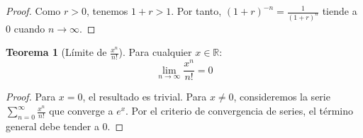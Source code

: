 \documentclass[12pt,a4paper]{article}
\theoremstyle{definition}
\newtheorem{teorema}{Teorema}[section]
\newcommand{\R}{\mathbb{R}}
\begin{document}
\begin{proof}
Como $r > 0$, tenemos $1 + r > 1$. Por tanto, $(1 + r)^{-n} = \frac{1}{(1 + r)^n}$ tiende a 0 cuando $n \to \infty$.
\end{proof}

\begin{teorema}[Límite de $\frac{x^n}{n!}$]
Para cualquier $x \in \R$:
\begin{equation}
\lim_{n \to \infty} \frac{x^n}{n!} = 0
\end{equation}
\end{teorema}

\begin{proof}
Para $x = 0$, el resultado es trivial. Para $x \neq 0$, consideremos la serie $\sum_{n=0}^{\infty} \frac{x^n}{n!}$ que converge a $e^x$. Por el criterio de convergencia de series, el término general debe tender a 0.
\end{proof}
\end{document}
